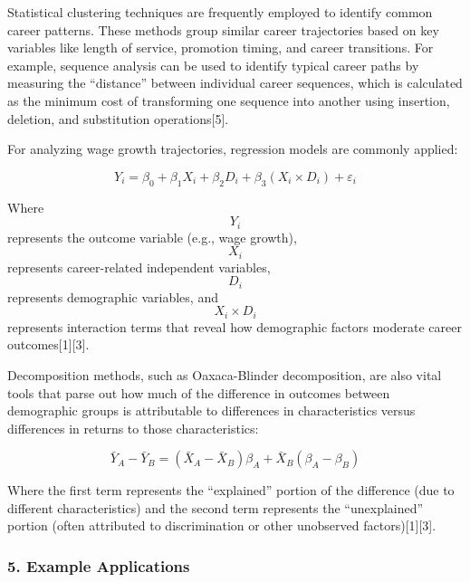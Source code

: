 \documentclass[./main.tex]{subfiles}
\begin{document}
Statistical clustering techniques are frequently employed to identify
common career patterns. These methods group similar career trajectories
based on key variables like length of service, promotion timing, and
career transitions. For example, sequence analysis can be used to
identify typical career paths by measuring the ``distance'' between
individual career sequences, which is calculated as the minimum cost of
transforming one sequence into another using insertion, deletion, and
substitution operations{[}5{]}.

For analyzing wage growth trajectories, regression models are commonly
applied:

\[ Y_i = \beta_0 + \beta_1 X_i + \beta_2 D_i + \beta_3 (X_i \times D_i) + \varepsilon_i \]

Where \[Y_i\] represents the outcome variable (e.g., wage growth),
\[X_i\] represents career-related independent variables, \[D_i\]
represents demographic variables, and \[X_i \times D_i\] represents
interaction terms that reveal how demographic factors moderate career
outcomes{[}1{]}{[}3{]}.

Decomposition methods, such as Oaxaca-Blinder decomposition, are also
vital tools that parse out how much of the difference in outcomes
between demographic groups is attributable to differences in
characteristics versus differences in returns to those characteristics:

\[ \bar{Y}_A - \bar{Y}_B = (\bar{X}_A - \bar{X}_B)\beta_A + \bar{X}_B(\beta_A - \beta_B) \]

Where the first term represents the ``explained'' portion of the
difference (due to different characteristics) and the second term
represents the ``unexplained'' portion (often attributed to
discrimination or other unobserved factors){[}1{]}{[}3{]}.

\subsubsection{5. Example Applications}\label{example-applications}
\end{document}
